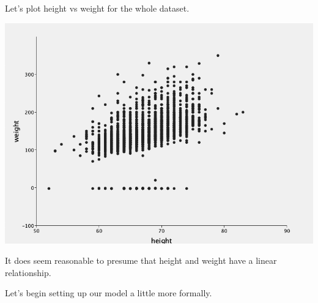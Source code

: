 \documentclass[12pt]{article}
\begin{document}
Let's plot height vs weight for the whole dataset.

\includegraphics[width={\textwidth}]{height-weight}

It does seem reasonable to presume that height and weight have a linear relationship. 

Let's begin setting up our model a little more formally. 
\end{document}
